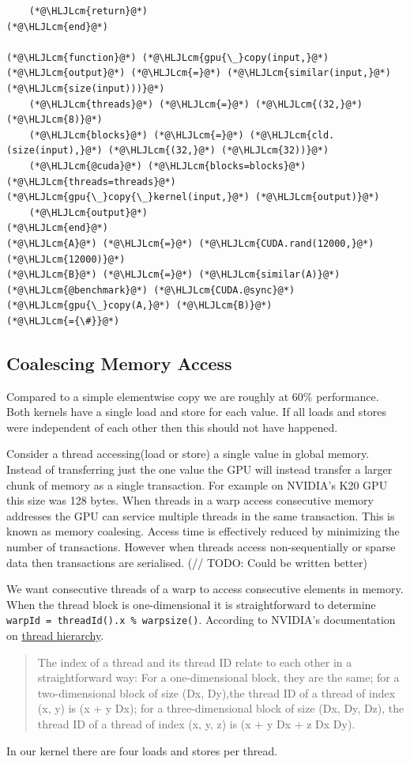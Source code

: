 \documentclass[12pt,a4paper]{article}
\newcommand{\HLJLcm}[1]{\textcolor[RGB]{153,153,119}{\textit{#1}}}
\begin{document}
\begin{lstlisting}
    (*@\HLJLcm{return}@*)
(*@\HLJLcm{end}@*)

(*@\HLJLcm{function}@*) (*@\HLJLcm{gpu{\_}copy(input,}@*) (*@\HLJLcm{output}@*) (*@\HLJLcm{=}@*) (*@\HLJLcm{similar(input,}@*) (*@\HLJLcm{size(input)))}@*)
    (*@\HLJLcm{threads}@*) (*@\HLJLcm{=}@*) (*@\HLJLcm{(32,}@*) (*@\HLJLcm{8)}@*)
    (*@\HLJLcm{blocks}@*) (*@\HLJLcm{=}@*) (*@\HLJLcm{cld.(size(input),}@*) (*@\HLJLcm{(32,}@*) (*@\HLJLcm{32))}@*)
    (*@\HLJLcm{@cuda}@*) (*@\HLJLcm{blocks=blocks}@*) (*@\HLJLcm{threads=threads}@*) (*@\HLJLcm{gpu{\_}copy{\_}kernel(input,}@*) (*@\HLJLcm{output)}@*)
    (*@\HLJLcm{output}@*)
(*@\HLJLcm{end}@*)
(*@\HLJLcm{A}@*) (*@\HLJLcm{=}@*) (*@\HLJLcm{CUDA.rand(12000,}@*) (*@\HLJLcm{12000)}@*)
(*@\HLJLcm{B}@*) (*@\HLJLcm{=}@*) (*@\HLJLcm{similar(A)}@*)
(*@\HLJLcm{@benchmark}@*) (*@\HLJLcm{CUDA.@sync}@*) (*@\HLJLcm{gpu{\_}copy(A,}@*) (*@\HLJLcm{B)}@*)
(*@\HLJLcm{={\#}}@*)
\end{lstlisting}


\subsection{Coalescing Memory Access}
Compared to a simple elementwise copy we are roughly at 60\% performance. Both kernels have a single load and store for each value. If all loads and stores were independent of each other then this should not have happened.

Consider a thread accessing(load or store) a single value in global memory. Instead of transferring just the one value the GPU will instead transfer a larger chunk of memory as a single transaction. For example on NVIDIA's K20 GPU this size was 128 bytes. When threads in a warp access consecutive memory addresses the GPU can service multiple threads in the same transaction. This is known as memory coalesing. Access time is effectively reduced by minimizing the number of transactions. However when threads access non-sequentially or sparse data then transactions are serialised. (// TODO: Could be written better)

We want consecutive threads of a warp to access consecutive elements in memory. When the thread block is one-dimensional it is straightforward to determine \texttt{warpId = threadId().x \% warpsize()}. According to NVIDIA's documentation on \href{https://docs.nvidia.com/cuda/cuda-c-programming-guide/index.html#thread-hierarchy}{thread hierarchy}.

\begin{quote}
The index of a thread and its thread ID relate to each other in a straightforward way: For a one-dimensional block, they are the same; for a two-dimensional block of size (Dx, Dy),the thread ID of a thread of index (x, y) is (x + y Dx); for a three-dimensional block of size (Dx, Dy, Dz), the thread ID of a thread of index (x, y, z) is (x + y Dx + z Dx Dy).

\end{quote}
In our kernel there are four loads and stores per thread.
\end{document}
